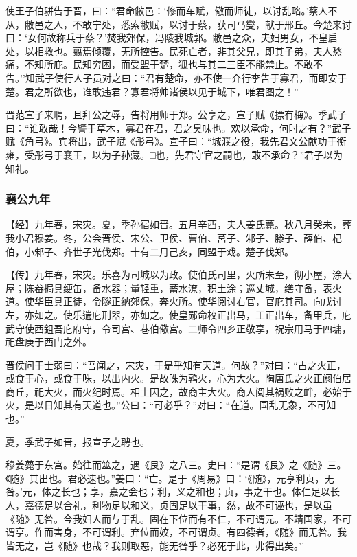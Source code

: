 \documentclass[]{article}
\begin{document}
使王子伯骈告于晋，曰：``君命敝邑：`修而车赋，儆而师徒，以讨乱略。'蔡人不从，敝邑之人，不敢宁处，悉索敝赋，以讨于蔡，获司马燮，献于邢丘。今楚来讨曰：`女何故称兵于蔡？'焚我郊保，冯陵我城郭。敝邑之众，夫妇男女，不皇启处，以相救也。翦焉倾覆，无所控告。民死亡者，非其父兄，即其子弟，夫人愁痛，不知所庇。民知穷困，而受盟于楚，狐也与其二三臣不能禁止。不敢不告。''知武子使行人子员对之曰：``君有楚命，亦不使一介行李告于寡君，而即安于楚。君之所欲也，谁敢违君？寡君将帅诸侯以见于城下，唯君图之！''

晋范宣子来聘，且拜公之辱，告将用师于郑。公享之，宣子赋《摽有梅》。季武子曰：``谁敢哉！今譬于草木，寡君在君，君之臭味也。欢以承命，何时之有？''武子赋《角弓》。宾将出，武子赋《彤弓》。宣子曰：``城濮之役，我先君文公献功于衡雍，受彤弓于襄王，以为子孙藏。□也，先君守官之嗣也，敢不承命？''君子以为知礼。

\hypertarget{header-n1915}{%
\subsubsection{襄公九年}\label{header-n1915}}

【经】九年春，宋灾。夏，季孙宿如晋。五月辛酉，夫人姜氏薨。秋八月癸未，葬我小君穆姜。冬，公会晋侯、宋公、卫侯、曹伯、莒子、邾子、滕子、薛伯、杞伯，小邾子、齐世子光伐郑。十有二月己亥，同盟于戏。楚子伐郑。

【传】九年春，宋灾。乐喜为司城以为政。使伯氏司里，火所未至，彻小屋，涂大屋；陈畚挶具绠缶，备水器；量轻重，蓄水潦，积土涂；巡丈城，缮守备，表火道。使华臣具正徒，令隧正纳郊保，奔火所。使华阅讨右官，官庀其司。向戌讨左，亦如之。使乐遄庀刑器，亦如之。使皇郧命校正出马，工正出车，备甲兵，庀武守使西鉏吾庀府守，令司宫、巷伯儆宫。二师令四乡正敬享，祝宗用马于四墉，祀盘庚于西门之外。

晋侯问于士弱曰：``吾闻之，宋灾，于是乎知有天道。何故？''对曰：``古之火正，或食于心，或食于咮，以出内火。是故咮为鹑火，心为大火。陶唐氏之火正阏伯居商丘，祀大火，而火纪时焉。相土因之，故商主大火。商人阅其祸败之衅，必始于火，是以日知其有天道也。''公曰：``可必乎？''对曰：``在道。国乱无象，不可知也。''

夏，季武子如晋，报宣子之聘也。

穆姜薨于东宫。始往而筮之，遇《艮》之八三。史曰：``是谓《艮》之《随》三。《随》其出也。君必速也。''姜曰：``亡。是于《周易》曰：`《随》，元亨利贞，无咎。'元，体之长也；享，嘉之会也；利，义之和也；贞，事之干也。体仁足以长人，嘉德足以合礼，利物足以和义，贞固足以干事，然，故不可诬也，是以虽《随》无咎。今我妇人而与于乱。固在下位而有不仁，不可谓元。不靖国家，不可谓亨。作而害身，不可谓利。弃位而姣，不可谓贞。有四德者，《随》而无咎。我皆无之，岂《随》也哉？我则取恶，能无咎乎？必死于此，弗得出矣。''
\end{document}
